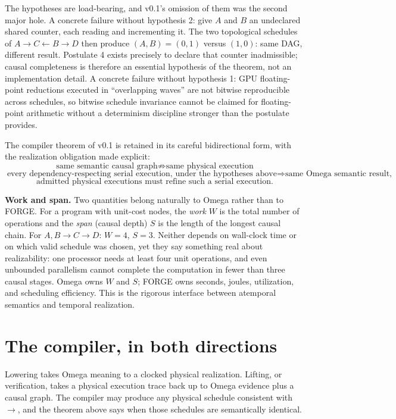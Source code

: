 \documentclass[11pt]{article}
\begin{document}
The hypotheses are load-bearing, and v0.1's omission of them was the second major hole. A concrete failure without hypothesis 2: give $A$ and $B$ an undeclared shared counter, each reading and incrementing it. The two topological schedules of $A \to C \leftarrow B \to D$ then produce $(A,B) = (0,1)$ versus $(1,0)$: same DAG, different result. Postulate 4 exists precisely to declare that counter inadmissible; causal completeness is therefore an essential hypothesis of the theorem, not an implementation detail. A concrete failure without hypothesis 1: GPU floating-point reductions executed in ``overlapping waves'' are not bitwise reproducible across schedules, so bitwise schedule invariance cannot be claimed for floating-point arithmetic without a determinism discipline stronger than the postulate provides.

The compiler theorem of v0.1 is retained in its careful bidirectional form, with the realization obligation made explicit:
\[
\boxed{\text{same semantic causal graph} \not\Rightarrow \text{same physical execution}}
\]
\[
\boxed{\text{every dependency-respecting serial execution, under the hypotheses above} \Rightarrow \text{same Omega semantic result,}}
\]
\[\boxed{\text{admitted physical executions must refine such a serial execution.}}\]

\textbf{Work and span.} Two quantities belong naturally to Omega rather than to FORGE. For a program with unit-cost nodes, the \textit{work} $W$ is the total number of operations and the \textit{span} (causal depth) $S$ is the length of the longest causal chain. For $A, B \to C \to D$: $W = 4$, $S = 3$. Neither depends on wall-clock time or on which valid schedule was chosen, yet they say something real about realizability: one processor needs at least four unit operations, and even unbounded parallelism cannot complete the computation in fewer than three causal stages. Omega owns $W$ and $S$; FORGE owns seconds, joules, utilization, and scheduling efficiency. This is the rigorous interface between atemporal semantics and temporal realization.

\section{The compiler, in both directions}

Lowering takes Omega meaning to a clocked physical realization. Lifting, or verification, takes a physical execution trace back up to Omega evidence plus a causal graph. The compiler may produce any physical schedule consistent with $\to$, and the theorem above says when those schedules are semantically identical.
\end{document}
